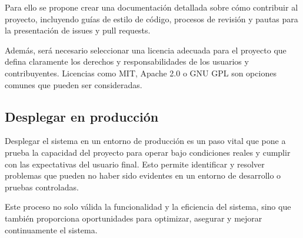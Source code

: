 Para ello se propone crear una documentación detallada sobre cómo contribuir al proyecto, incluyendo guías de estilo
de código, procesos de revisión y pautas para la presentación de issues y pull requests.

Además, será necesario seleccionar una licencia adecuada para el proyecto que defina claramente los derechos y
responsabilidades de los usuarios y contribuyentes.
Licencias como MIT, Apache 2.0 o GNU GPL son opciones comunes que pueden ser consideradas.

\subsection{Desplegar en producción}

Desplegar el sistema en un entorno de producción es un paso vital que pone a prueba la capacidad del proyecto para
operar bajo condiciones reales y cumplir con las expectativas del usuario final.
Esto permite identificar y resolver problemas que pueden no haber sido evidentes en un entorno de desarrollo o
pruebas controladas.

Este proceso no solo válida la funcionalidad y la eficiencia del sistema, sino que también proporciona oportunidades
para optimizar, asegurar y mejorar continuamente el sistema.